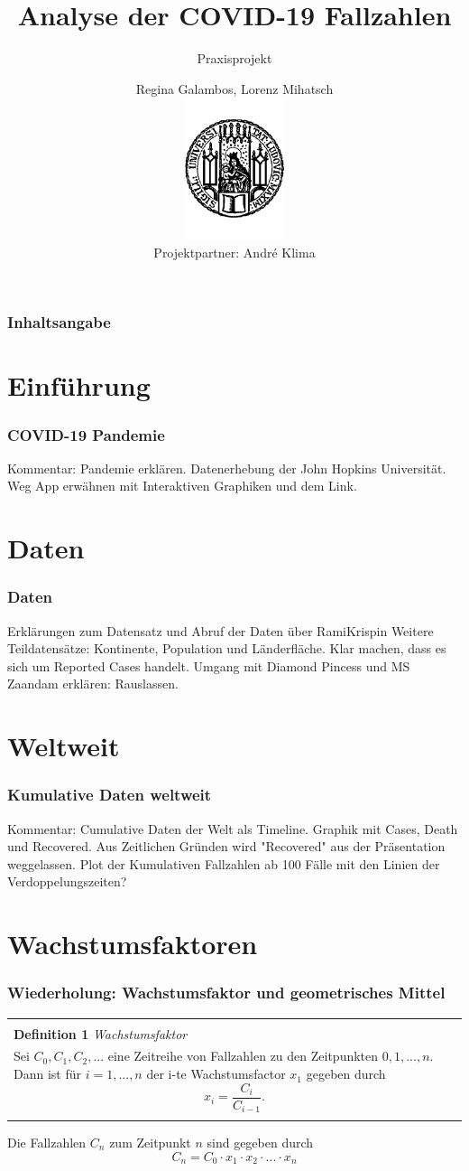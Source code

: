 \documentclass{beamer}
\title[Praxisprojekt: COVID-19]{Analyse der COVID-19 Fallzahlen}
\subtitle{Praxisprojekt}
\author[R.Galambos, L.Mihatsch]{Regina Galambos, Lorenz Mihatsch\\
	\includegraphics[width=0.22\textwidth]{LMU.pdf}\\
	{\small Projektpartner: Andr\'{e} Klima}}
\newenvironment{boxeded}
    {\begin{center}
    \begin{tabular}{|p{0.9\textwidth}|}
    \hline\\
    }
    { 
    \\\\\hline
    \end{tabular} 
    \end{center}
    }
\begin{document}
\begin{frame}
	\titlepage
\end{frame}

\begin{frame}
   \frametitle{Inhaltsangabe}
   \tableofcontents
 \end{frame}
 
 
 \section{Einführung}
 \begin{frame}
 	\frametitle{COVID-19 Pandemie}
	Kommentar: Pandemie erklären. Datenerhebung der John Hopkins Universität.
	Weg App erwähnen mit Interaktiven Graphiken und dem Link.
 \end{frame}
 \section{Daten}
  
 \begin{frame}
 	\frametitle{Daten}
	Erklärungen zum Datensatz und Abruf der Daten über RamiKrispin
	Weitere Teildatensätze: Kontinente, Population und Länderfläche.
	Klar machen, dass es sich um Reported Cases handelt.
	Umgang mit Diamond Pincess und MS Zaandam erklären: Rauslassen.
 \end{frame}
 
 \section{Weltweit}
 \begin{frame}
 	\frametitle{Kumulative Daten weltweit}
	Kommentar: Cumulative Daten der Welt als Timeline. Graphik mit Cases, Death und Recovered.
	Aus Zeitlichen Gründen wird "Recovered" aus der Präsentation weggelassen.
	Plot der Kumulativen Fallzahlen ab 100 Fälle mit den Linien der Verdoppelungszeiten?
	
 \end{frame}
 
\section{Wachstumsfaktoren}
\begin{frame}
\frametitle{Wiederholung: Wachstumsfaktor und geometrisches Mittel}
	\begin{boxeded}
	\textbf{Definition 1} \textit{Wachstumsfaktor}\\
	Sei $C_0, C_1, C_2, ...$ eine Zeitreihe von Fallzahlen zu den Zeitpunkten $0, 1, ..., n$. Dann ist für $i = 1, ..., n$ der i-te Wachstumsfactor $x_1$ gegeben durch $$ x_i = \frac{C_i}{C_{i-1}}.$$
	\end{boxeded}

	Die Fallzahlen $C_n$ zum Zeitpunkt $n$ sind gegeben durch $$C_n = C_0 \cdot x_1 \cdot x_2 \cdot ... \cdot x_n$$
\end{frame}
\end{document}
